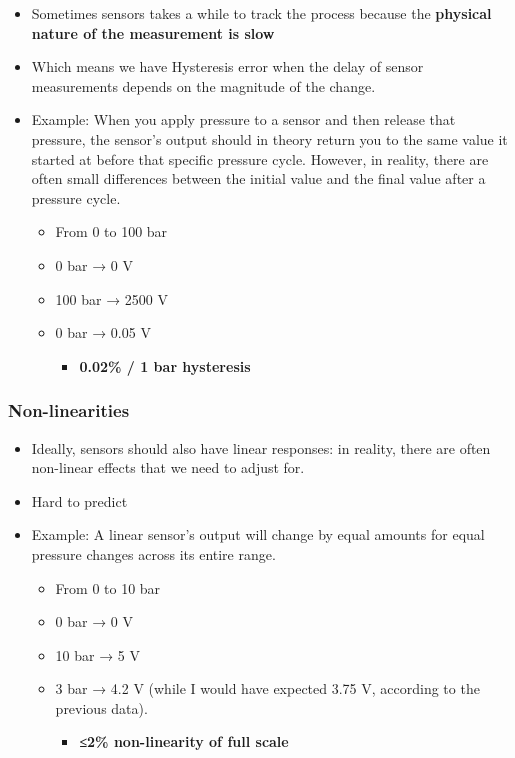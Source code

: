 \documentclass[
]{article}
\providecommand{\tightlist}{%
  \setlength{\itemsep}{0pt}\setlength{\parskip}{0pt}}
\begin{document}
\begin{itemize}
\item
  Sometimes sensors takes a while to track the process because the
  \textbf{physical nature of the measurement is slow}
\item
  Which means we have Hysteresis error when the delay of sensor
  measurements depends on the magnitude of the change.
\item
  Example: When you apply pressure to a sensor and then release that
  pressure, the sensor's output should in theory return you to the same
  value it started at before that specific pressure cycle. However, in
  reality, there are often small differences between the initial value
  and the final value after a pressure cycle.

  \begin{itemize}
  \tightlist
  \item
    From 0 to 100 bar
  \item
    0 bar → 0 V
  \item
    100 bar → 2500 V
  \item
    0 bar → 0.05 V

    \begin{itemize}
    \tightlist
    \item
      \textbf{0.02\% / 1 bar hysteresis}
    \end{itemize}
  \end{itemize}
\end{itemize}

\subsubsection{Non-linearities}\label{non-linearities}

\begin{itemize}
\item
  Ideally, sensors should also have linear responses: in reality, there
  are often non-linear effects that we need to adjust for.
\item
  Hard to predict
\item
  Example: A linear sensor's output will change by equal amounts for
  equal pressure changes across its entire range.

  \begin{itemize}
  \tightlist
  \item
    From 0 to 10 bar
  \item
    0 bar → 0 V
  \item
    10 bar → 5 V
  \item
    3 bar → 4.2 V (while I would have expected 3.75 V, according to the
    previous data).

    \begin{itemize}
    \tightlist
    \item
      \textbf{≤2\% non-linearity of full scale}
    \end{itemize}
  \end{itemize}
\end{itemize}
\end{document}
